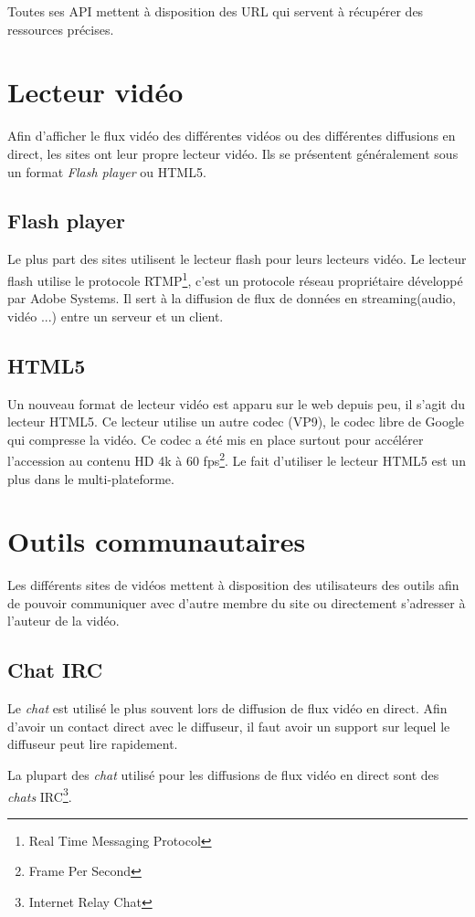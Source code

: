 \documentclass[11pt]{report} %
\begin{document}
		Toutes ses API mettent à disposition des URL qui servent à récupérer des ressources précises. 
		
		
	\section{Lecteur vidéo}
	Afin d'afficher le flux vidéo des différentes vidéos ou des différentes diffusions en direct, les sites ont leur propre lecteur vidéo.
	Ils se présentent généralement sous un format \textit{Flash player} ou HTML5.
	
		\subsection{Flash player}
		Le plus part des sites utilisent le lecteur flash pour leurs lecteurs vidéo. Le lecteur flash utilise le protocole RTMP\footnote{Real Time Messaging Protocol}, c'est un protocole réseau propriétaire développé par Adobe Systems. Il sert à la diffusion de flux de données en streaming(audio, vidéo ...) entre un serveur et un client.
		
		\subsection{HTML5}
		Un nouveau format de lecteur vidéo est apparu sur le web depuis peu, il s'agit du lecteur HTML5. Ce lecteur utilise un autre codec (VP9), le codec libre de Google qui compresse la vidéo. Ce codec a été mis en place surtout pour accélérer l'accession au contenu HD 4k à 60 fps\footnote{Frame Per Second}.
		Le fait d'utiliser le lecteur HTML5 est un plus dans le multi-plateforme.
	
	\section{Outils communautaires}
	Les différents sites de vidéos mettent à disposition des utilisateurs des outils afin de pouvoir communiquer avec d'autre membre du site ou directement s'adresser à l'auteur de la vidéo.
		\subsection{Chat IRC}
		\label{chat}
		Le \textit{chat} est utilisé le plus souvent lors de diffusion de flux vidéo en direct. Afin d'avoir un contact direct avec le diffuseur, il faut avoir un support sur lequel le diffuseur peut lire rapidement.
		
		La plupart des \textit{chat} utilisé pour les diffusions de flux vidéo en direct sont des \textit{chats} IRC\footnote{Internet Relay Chat}.
		
\end{document}
